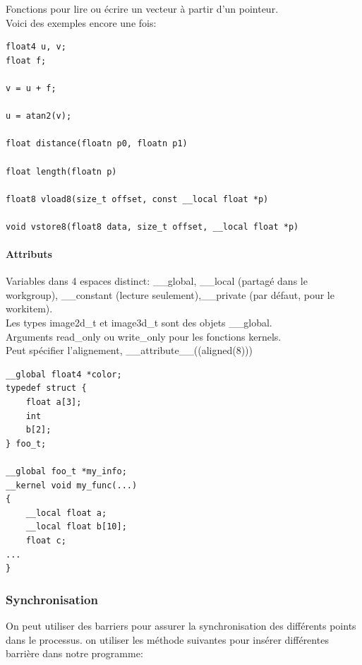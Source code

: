 \documentclass[oneside]{book}
\begin{document}
Fonctions pour lire ou écrire un vecteur à partir d'un pointeur.\\

Voici des exemples encore une fois:
\begin{lstlisting}
float4 u, v;
float f;

v = u + f;

u = atan2(v);

float distance(floatn p0, floatn p1)

float length(floatn p)

float8 vload8(size_t offset, const __local float *p)

void vstore8(float8 data, size_t offset, __local float *p)
\end{lstlisting}
\paragraph{Attributs}
Variables dans 4 espaces distinct: \_\_global, \_\_local (partagé dans le workgroup), \_\_constant (lecture seulement),\_\_private (par défaut, pour le workitem).\\

Les types image2d\_t et image3d\_t sont des objets \_\_global.\\

Arguments read\_only ou write\_only pour les fonctions kernels.\\

Peut spécifier l'alignement, \_\_attribute\_\_((aligned(8)))\\

\begin{lstlisting}
__global float4 *color;
typedef struct {
	float a[3];
	int
	b[2];
} foo_t;

__global foo_t *my_info;
__kernel void my_func(...)
{
	__local float a;
	__local float b[10];
	float c;
...
}
\end{lstlisting} 

\subsubsection{Synchronisation}
On peut utiliser des barriers pour assurer la synchronisation des différents points dans le processus. on utiliser les méthode suivantes pour insérer différentes barrière dans notre programme:\\
\end{document}
